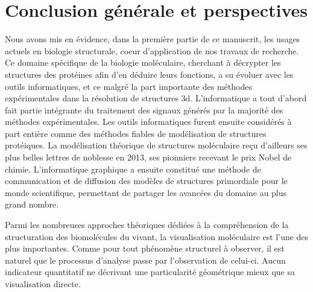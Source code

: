 


\chapter*{Conclusion générale et perspectives}
\mtcaddchapter

\mtcaddpart



Nous avons mis en évidence, dans la première partie de ce manuscrit, les usages actuels en biologie structurale, coeur d'application de nos travaux de recherche. Ce domaine spécifique de la biologie moléculaire, cherchant à décrypter les structures des protéines afin d'en déduire leurs fonctions, a su évoluer avec les outils informatiques, et ce malgré la part importante des méthodes expérimentales dans la résolution de structures 3d. 
L'informatique a tout d'abord fait partie intégrante du traitement des signaux générés par la majorité des méthodes expérimentales. Les outils informatiques furent ensuite considérés à part entière comme des méthodes fiables de modélisation de structures protéiques. La modélisation théorique de structures moléculaire reçu d'ailleurs ses plus belles lettres de noblesse en 2013, ses pionniers recevant le prix Nobel de chimie. L'informatique graphique a ensuite constitué une méthode de communication et de diffusion des modèles de structures primordiale pour le monde scientifique, permettant de partager les avancées du domaine au plus grand nombre.

Parmi les nombreuses approches théoriques dédiées à la compréhension de la structuration des biomolécules du vivant, la visualisation moléculaire est l'une des plus importantes. Comme pour tout phénomène structurel à observer, il est naturel que le processus d'analyse passe par l'observation de celui-ci. Aucun indicateur quantitatif ne décrivant une particularité géométrique mieux que sa visualisation directe.

